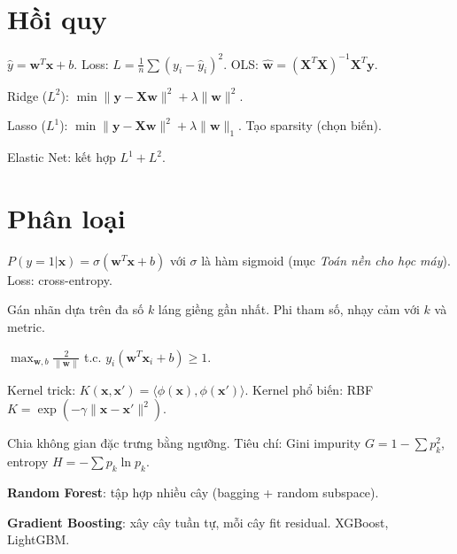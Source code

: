 \documentclass[12pt,a4paper]{article}
\begin{document}
\section{Hồi quy}

\begin{dinhnghia}[title={Hồi quy tuyến tính}]
  $\hat{y} = \mathbf{w}^T\mathbf{x} + b$. Loss: $L = \frac{1}{n}\sum(y_i - \hat{y}_i)^2$. OLS: $\hat{\mathbf{w}} = (\mathbf{X}^T\mathbf{X})^{-1}\mathbf{X}^T\mathbf{y}$.
\end{dinhnghia}

\begin{dinhnghia}[title={Regularization}]
  Ridge ($L^2$): $\min \|\mathbf{y} - \mathbf{X}\mathbf{w}\|^2 + \lambda\|\mathbf{w}\|^2$.

  Lasso ($L^1$): $\min \|\mathbf{y} - \mathbf{X}\mathbf{w}\|^2 + \lambda\|\mathbf{w}\|_1$. Tạo sparsity (chọn biến).

  Elastic Net: kết hợp $L^1 + L^2$.
\end{dinhnghia}

\section{Phân loại}

\begin{dinhnghia}[title={Hồi quy logistic}]
  $P(y=1|\mathbf{x}) = \sigma(\mathbf{w}^T\mathbf{x} + b)$ với $\sigma$ là hàm sigmoid (mục \emph{Toán nền cho học máy}).
  Loss: cross-entropy.
\end{dinhnghia}

\begin{dinhnghia}[title={k-NN (k Nearest Neighbors)}]
  Gán nhãn dựa trên đa số $k$ láng giềng gần nhất. Phi tham số, nhạy cảm với $k$ và metric.
\end{dinhnghia}

\begin{dinhnghia}[title={SVM (Support Vector Machine)}]
  $\max_{\mathbf{w}, b} \frac{2}{\|\mathbf{w}\|}$ t.c. $y_i(\mathbf{w}^T\mathbf{x}_i + b) \ge 1$.

  Kernel trick: $K(\mathbf{x}, \mathbf{x}') = \langle\phi(\mathbf{x}), \phi(\mathbf{x}')\rangle$. Kernel phổ biến: RBF $K = \exp(-\gamma\|\mathbf{x} - \mathbf{x}'\|^2)$.
\end{dinhnghia}

\begin{dinhnghia}[title={Cây quyết định}]
  Chia không gian đặc trưng bằng ngưỡng. Tiêu chí: Gini impurity $G = 1 - \sum p_k^2$, entropy $H = -\sum p_k\ln p_k$.

  \textbf{Random Forest}: tập hợp nhiều cây (bagging + random subspace).

  \textbf{Gradient Boosting}: xây cây tuần tự, mỗi cây fit residual. XGBoost, LightGBM.
\end{dinhnghia}
\end{document}

